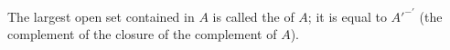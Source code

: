 The largest open set contained in $A$ is called the  of $A$; it is equal to $A'^{-'}$ (the complement of the closure of the complement of $A$).

